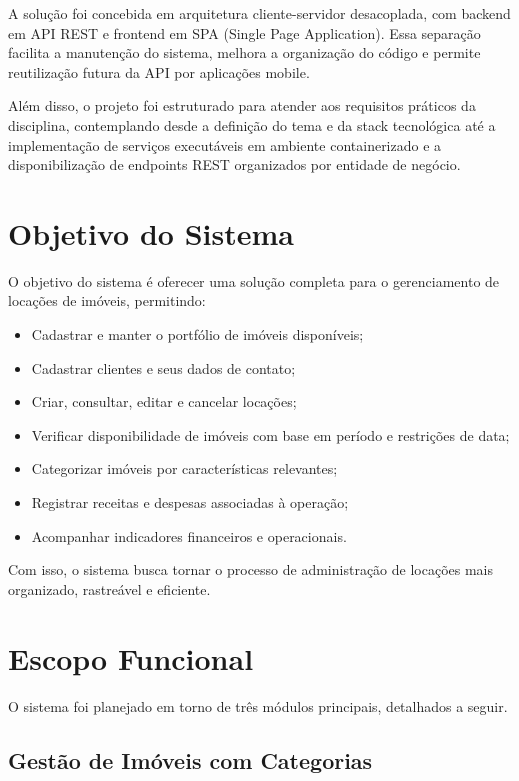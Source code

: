 \documentclass[12pt, a4paper]{article}
\begin{document}
A solução foi concebida em arquitetura cliente-servidor desacoplada, com backend em API REST e frontend em SPA (Single Page Application). Essa separação facilita a manutenção do sistema, melhora a organização do código e permite reutilização futura da API por aplicações mobile.

Além disso, o projeto foi estruturado para atender aos requisitos práticos da disciplina, contemplando desde a definição do tema e da stack tecnológica até a implementação de serviços executáveis em ambiente containerizado e a disponibilização de endpoints REST organizados por entidade de negócio.

\section{Objetivo do Sistema}

O objetivo do sistema é oferecer uma solução completa para o gerenciamento de locações de imóveis, permitindo:

\begin{itemize}[leftmargin=1.5em]
  \item Cadastrar e manter o portfólio de imóveis disponíveis;
  \item Cadastrar clientes e seus dados de contato;
  \item Criar, consultar, editar e cancelar locações;
  \item Verificar disponibilidade de imóveis com base em período e restrições de data;
  \item Categorizar imóveis por características relevantes;
  \item Registrar receitas e despesas associadas à operação;
  \item Acompanhar indicadores financeiros e operacionais.
\end{itemize}

Com isso, o sistema busca tornar o processo de administração de locações mais organizado, rastreável e eficiente.

\section{Escopo Funcional}

O sistema foi planejado em torno de três módulos principais, detalhados a seguir.

\subsection{Gestão de Imóveis com Categorias}
\end{document}
